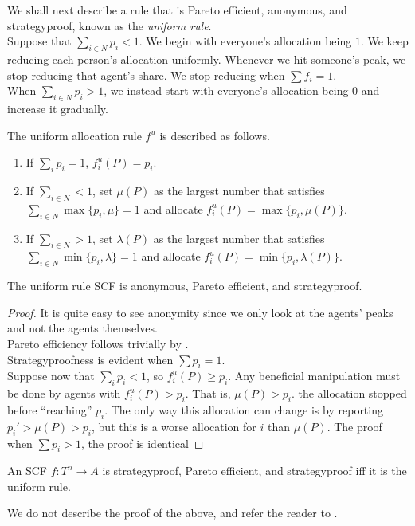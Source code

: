 		We shall next describe a rule that is Pareto efficient, anonymous, and strategyproof, known as the \emph{uniform rule}.\\
		Suppose that $\sum_{i \in N} p_i < 1$. We begin with everyone's allocation being $1$. We keep reducing each person's allocation uniformly. Whenever we hit someone's peak, we stop reducing that agent's share. We stop reducing when $\sum f_i = 1$.\\
		When $\sum_{i \in N} p_i > 1$, we instead start with everyone's allocation being $0$ and increase it gradually.

		\begin{fdef}
			The uniform allocation rule $f^u$ is described as follows.
			\begin{enumerate}
				\item If $\sum_i p_i = 1$, $f_i^u(P) = p_i$.
				\item If $\sum_{i \in N} < 1$, set $\mu(P)$ as the largest number that satisfies $\sum_{i \in N} \max\{p_i,\mu\} = 1$ and allocate $f_i^u(P) = \max\{p_i,\mu(P)\}$.
				\item If $\sum_{i \in N} > 1$, set $\lambda(P)$ as the largest number that satisfies $\sum_{i \in N} \min\{p_i,\lambda\} = 1$ and allocate $f_i^u(P) = \min\{p_i,\lambda(P)\}$.
			\end{enumerate}
		\end{fdef}

		\begin{flem}
			The uniform rule SCF is anonymous, Pareto efficient, and strategyproof.
		\end{flem}
		\begin{proof}
			It is quite easy to see anonymity since we only look at the agents' peaks and not the agents themselves.\\
			Pareto efficiency follows trivially by .\\
			Strategyproofness is evident when $\sum p_i = 1$.\\
			Suppose now that $\sum_i p_i < 1$, so $f_i^u(P) \ge p_i$. Any beneficial manipulation must be done by agents with $f_i^u(P) > p_i$. That is, $\mu(P) > p_i$. the allocation stopped before ``reaching'' $p_i$. The only way this allocation can change is by reporting $p_i' > \mu(P) > p_i$, but this is a worse allocation for $i$ than $\mu(P)$. The proof when $\sum p_i > 1$, the proof is identical
		\end{proof}

		\begin{ftheo}[Sprumont]
			An SCF $f : T^n \to A$ is strategyproof, Pareto efficient, and strategyproof iff it is the uniform rule.
		\end{ftheo}
		We do not describe the proof of the above, and refer the reader to \cite{sprumont-uniform-rule}.

